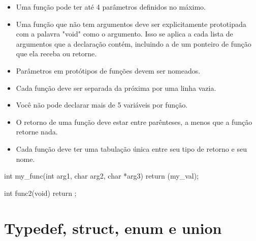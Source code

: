 \documentclass{42-pt}
\begin{document}
        \begin{itemize}

            \item Uma função pode ter até 4 parâmetros definidos no máximo.

            \item Uma função que não tem argumentos deve ser
                explicitamente prototipada com a palavra "void" como o
                argumento. Isso se aplica a cada lista de argumentos que a declaração
                contém, incluindo a de um ponteiro de função que ela receba ou retorne.

            \item Parâmetros em protótipos de funções devem ser nomeados.

            \item Cada função deve ser separada da próxima por
                uma linha vazia.

            \item Você não pode declarar mais de 5 variáveis por função.

            \item O retorno de uma função deve estar entre parênteses, a menos
                que a função retorne nada.

            \item Cada função deve ter uma tabulação única entre seu
                tipo de retorno e seu nome.

        \end{itemize}

\vspace{1cm}

            \begin{42ccode}
int my_func(int arg1, char arg2, char *arg3)
{
    return (my_val);
}

int func2(void)
{
    return ;
}
            \end{42ccode}

        \newpage


    \section{Typedef, struct, enum e union}
\end{document}
